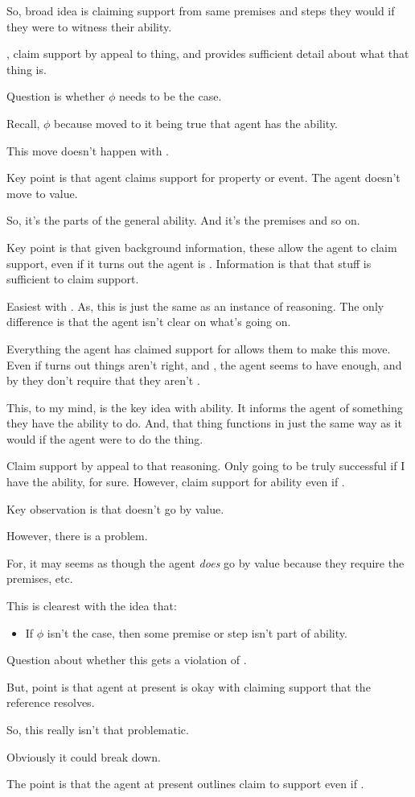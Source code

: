 \begin{note}
  So, broad idea is claiming support from same premises and steps they would if they were to witness their ability.

  \adB{}, claim support by appeal to thing, and \WR{} provides sufficient detail about what that thing is.

  Question is whether \(\phi\) needs to be the case.

  Recall, \(\phi\) because moved to it being true that agent has the ability.

  This move doesn't happen with \adB{}.


  Key point is that agent claims support for property or event.
  The agent doesn't move to value.

  So, \gsi{} it's the parts of the general ability.
  And  it's the premises and so on.

  Key point is that given background information, these allow the agent to claim support, even if it turns out the agent is \mom{}.
  Information is that that stuff is sufficient to claim support.

  Easiest with \WR{}.
  As, this is just the same as an instance of reasoning.
  The only difference is that the agent isn't clear on what's going on.

  Everything the agent has claimed support for allows them to make this move.
  Even if turns out things aren't right, and \mom{}, the agent seems to have enough, and by \adB{} they don't require that they aren't \mom{}.

  This, to my mind, is the key idea with ability.
  It informs the agent of something they have the ability to do.
  And, that thing functions in just the same way as it would if the agent were to do the thing.

  Claim support by appeal to that reasoning.
  Only going to be truly successful if I have the ability, for sure.
  However, claim support for ability even if \mom{}.
\end{note}

\begin{note}
  Key observation is that \adB{} doesn't go by value.

  However, there is a problem.

  For, it may seems as though the agent \emph{does} go by value because they require the premises, etc.

  This is clearest with the idea that:
  \begin{itemize}
  \item If \(\phi\) isn't the case, then some premise or step isn't part of ability.
  \end{itemize}
  Question about whether this gets a violation of \eiS{}.

  But, point is that agent at present is okay with claiming support that the reference resolves.

  So, this really isn't that problematic.

  Obviously it could break down.

  The point is that the agent at present outlines claim to support even if \mom{}.
\end{note}

